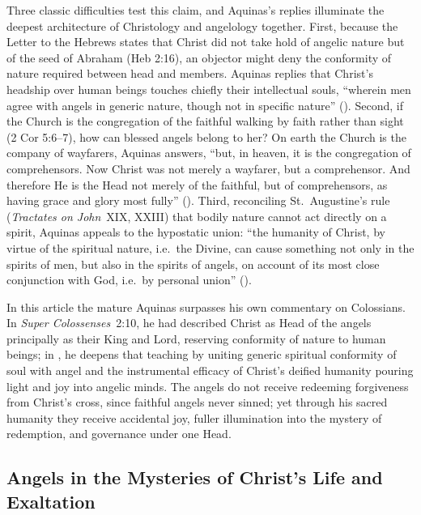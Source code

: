 Three classic difficulties test this claim, and Aquinas's replies illuminate the deepest architecture of Christology and angelology together. First, because the Letter to the Hebrews states that Christ did not take hold of angelic nature but of the seed of Abraham (Heb 2:16), an objector might deny the conformity of nature required between head and members. Aquinas replies that Christ's headship over human beings touches chiefly their intellectual souls, ``wherein men agree with angels in generic nature, though not in specific nature'' (). Second, if the Church is the congregation of the faithful walking by faith rather than sight (2 Cor 5:6--7), how can blessed angels belong to her? On earth the Church is the company of wayfarers, Aquinas answers, ``but, in heaven, it is the congregation of comprehensors. Now Christ was not merely a wayfarer, but a comprehensor. And therefore He is the Head not merely of the faithful, but of comprehensors, as having grace and glory most fully'' (). Third, reconciling St.~Augustine's rule (\emph{Tractates on John}~XIX, XXIII) that bodily nature cannot act directly on a spirit, Aquinas appeals to the hypostatic union: ``the humanity of Christ, by virtue of the spiritual nature, i.e.\ the Divine, can cause something not only in the spirits of men, but also in the spirits of angels, on account of its most close conjunction with God, i.e.\ by personal union'' ().

In this article the mature Aquinas surpasses his own commentary on Colossians. In \emph{Super Colossenses}~2:10, he had described Christ as Head of the angels principally as their King and Lord, reserving conformity of nature to human beings; in , he deepens that teaching by uniting generic spiritual conformity of soul with angel and the instrumental efficacy of Christ's deified humanity pouring light and joy into angelic minds. The angels do not receive redeeming forgiveness from Christ's cross, since faithful angels never sinned; yet through his sacred humanity they receive accidental joy, fuller illumination into the mystery of redemption, and governance under one Head.

\subsection{Angels in the Mysteries of Christ's Life and Exaltation}

